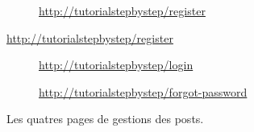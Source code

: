 \begin{figure}[!h]
    \begin{subfigure}[c]{0.73\textwidth}
    \end{subfigure}\hfill
    \begin{subfigure}[c]{0.24\textwidth}
        \caption{\url{http://tutorialstepbystep/register}} 
    \end{subfigure}
\end{figure}
\begin{figure}[!h]\ContinuedFloat{}
    \begin{subfigure}[c]{0.73\textwidth}
    \end{subfigure}\hfill
    \begin{subfigure}[c]{0.24\textwidth}
        \caption{\url{http://tutorialstepbystep/login}} 
    \end{subfigure}
    \begin{subfigure}[c]{0.73\textwidth}
    \end{subfigure}\hfill
    \begin{subfigure}[c]{0.24\textwidth}
        \caption{\url{http://tutorialstepbystep/forgot-password}\label{fig:auth_forgot}} 
    \end{subfigure}
    \caption{Les quatres pages de gestions des posts.}
\end{figure}

